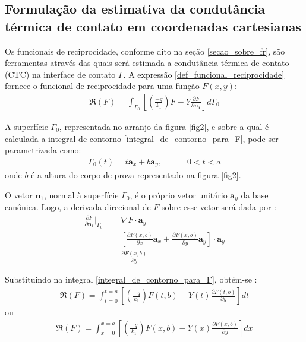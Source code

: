 \subsection{Formulação da estimativa da condutância térmica de contato em coordenadas cartesianas}\label{secao_com_funcionais}

Os funcionais de reciprocidade, conforme dito na seção \ref{secao_sobre_fr}, são ferramentas através das quais será estimada a condutância térmica de contato (CTC) na interface de contato $\Gamma$. A expressão \eqref{def_funcional_reciprocidade} fornece o funcional de reciprocidade para uma função $F(x, y)$:
\begin{align}
\Re(F)
=
\int_{\Gamma_0}\left[\left(\frac{-q}{k_1}\right)F - Y\frac{\partial F}{\partial\mathbf{n_1}}\right]d\Gamma_0
\label{integral_de_contorno_para_F}
\end{align}

A superfície $\Gamma_0$, representada no arranjo da figura \ref{fig2}, e sobre a qual é calculada a integral de contorno \eqref{integral_de_contorno_para_F}, pode ser parametrizada como:
\begin{align}
\Gamma_0(t) = t\mathbf{a}_x + b \mathbf{a}_y, \quad\quad\quad 0 < t < a
\end{align}
onde $b$ é a altura do corpo de prova representado na figura \ref{fig2}.

O vetor $\mathbf{n}_1$, normal à superfície $\Gamma_0$, é o próprio vetor unitário $\mathbf{a}_y$ da base canônica. Logo, a derivada direcional de $F$ sobre esse vetor será dada por \citep{livro_stewart}:
\begin{align}
\frac{\partial F}{\partial\mathbf{n}_1}\bigg|_{\Gamma_0} & = \nabla F \cdot \mathbf{a}_y \nonumber \\
& = \left[\frac{\partial F(x, b)}{\partial x}\mathbf{a}_x + \frac{\partial F(x, b)}{\partial y}\mathbf{a}_y \right] \cdot \mathbf{a}_y \nonumber \\
& = \frac{\partial F(x, b)}{\partial y}
\end{align} 

Substituindo na integral \eqref{integral_de_contorno_para_F}, obtém-se \citep{livro_stewart}:
\begin{align}
\Re(F)
=
\int_{t=0}^{t=a} \left[\left(\frac{-q}{k_1}\right)F(t, b) - Y(t)\frac{\partial F(t, b)}{\partial y}\right] dt
\label{integral_de_contorno_para_F_2}
\end{align}
ou
\begin{align}
\Re(F)
=
\int_{x=0}^{x=a} \left[\left(\frac{-q}{k_1}\right)F(x, b) - Y(x)\frac{\partial F(x, b)}{\partial y}\right] dx
\label{integral_de_contorno_para_F_3}
\end{align}

